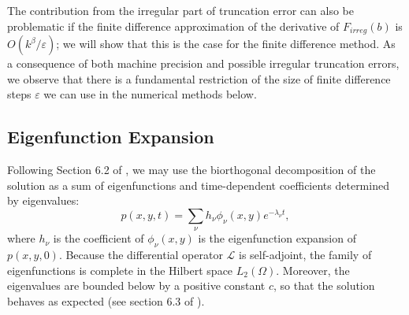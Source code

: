 \documentclass[10pt]{article}
\begin{document}
The contribution from the irregular part of truncation error can also
be problematic if the finite difference approximation of the
derivative of $F_{irreg}(b)$ is $O(k^\beta/\varepsilon)$; we will show
that this is the case for the finite difference method.  As a
consequence of both machine precision and possible irregular
truncation errors, we observe that there is a fundamental restriction
of the size of finite difference steps $\varepsilon$ we can use in the
numerical methods below.

\subsection{Eigenfunction Expansion} \label{sec:eigenfunction}
Following Section 6.2 of \cite{risken1989fokker-planck}, we may use
the biorthogonal decomposition of the solution as a sum of
eigenfunctions and time-dependent coefficients determined by eigenvalues:
\begin{equation}
  p(x,y,t) =  \sum_\nu h_\nu \phi_\nu (x, y) e^{-\lambda_\nu t}, \label{eq:biorthogonal}
\end{equation}
where $h_\nu$ is the coefficient of $\phi_\nu(x, y)$ is the
eigenfunction expansion of $p(x,y,0)$. Because the differential
operator $\mathcal{L}$ is self-adjoint, the family of eigenfunctions
is complete in the Hilbert space $L_2(\Omega)$. Moreover, the
eigenvalues are bounded below by a positive constant $c$, so that the
solution behaves as expected (see section 6.3 of
\cite{risken1989fokker-planck}).
\end{document}
